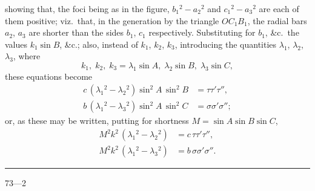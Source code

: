 \documentclass[11pt,a4paper]{book}
\begin{document}
showing that, the foci being as in the figure, $b_1{}^{\!2} - a_2{}^{\!2}$ and $c_1{}^{\!2} - a_3{}^{\!2}$ are each of them positive; viz.\ that, in the generation by the triangle $OC_1B_1$, the radial bars $a_2$, $a_3$ are shorter than the sides $b_1$, $c_1$ respectively. Substituting for $b_1$, \&c.\ the values $k_1\sin B$, \&c.; also, instead of $k_1$, $k_2$, $k_3$, introducing the quantities $\lambda_1$, $\lambda_2$, $\lambda_3$, where
\[
k_1,\; k_2,\; k_3 = \lambda_1\sin A,\; \lambda_2\sin B,\; \lambda_3\sin C,
\]
these equations become
\begin{align*}
c\, (\lambda_1{}^{\!2} - \lambda_2{}^{\!2}) \sin^2 A \, \sin^2 B &= \tau\tau'\tau'', \\
b\, (\lambda_1{}^{\!2} - \lambda_3{}^{\!2}) \sin^2 A \, \sin^2 C &= \sigma\sigma'\sigma'';
\end{align*}
or, as these may be written, putting for shortness $M = \sin A \sin B \sin C$,
\begin{align*}
M^2 k^2\, (\lambda_1{}^{\!2} - \lambda_2{}^{\!2}) &= c\, \tau\tau'\tau'', \\
M^2 k^2\, (\lambda_1{}^{\!2} - \lambda_3{}^{\!2}) &= b\, \sigma\sigma'\sigma''.
\end{align*}

\vspace{1ex}
\noindent\rule{2em}{0.4pt}\hfill 73---2
\newpage
\end{document}
